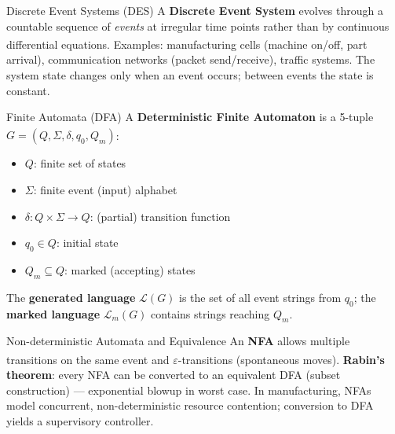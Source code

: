 \begin{v3topic}{Discrete Event Systems (DES)}
    A \textbf{Discrete Event System} evolves through a countable sequence of \emph{events} at irregular time points rather than by continuous differential equations\textsuperscript{\cite[][pp.~1--20]{cassandrasIntroductionDiscreteEvent2009}}.
    Examples: manufacturing cells (machine on/off, part arrival), communication networks (packet send/receive), traffic systems.
    The system state changes only when an event occurs; between events the state is constant.

\end{v3topic}
\begin{v3topic}{Finite Automata (DFA)}
    A \textbf{Deterministic Finite Automaton} is a 5-tuple $G = (Q, \Sigma, \delta, q_0, Q_m)$\textsuperscript{\cite[][pp.~23--35]{linzIntroductionFormalLanguages2006}}:
    \begin{itemize}
        \item $Q$: finite set of states
        \item $\Sigma$: finite event (input) alphabet
        \item $\delta: Q \times \Sigma \to Q$: (partial) transition function
        \item $q_0 \in Q$: initial state
        \item $Q_m \subseteq Q$: marked (accepting) states
    \end{itemize}
    The \textbf{generated language} $\mathcal{L}(G)$ is the set of all event strings from $q_0$; the \textbf{marked language} $\mathcal{L}_m(G)$ contains strings reaching $Q_m$.

\end{v3topic}
\begin{v3topic}{Non-deterministic Automata and Equivalence}
    An \textbf{NFA} allows multiple transitions on the same event and $\varepsilon$-transitions (spontaneous moves)\textsuperscript{\cite[][pp.~50--70]{linzIntroductionFormalLanguages2006}}.
    \textbf{Rabin's theorem}: every NFA can be converted to an equivalent DFA (subset construction) — exponential blowup in worst case.
    In manufacturing, NFAs model concurrent, non-deterministic resource contention; conversion to DFA yields a supervisory controller.

\end{v3topic}
